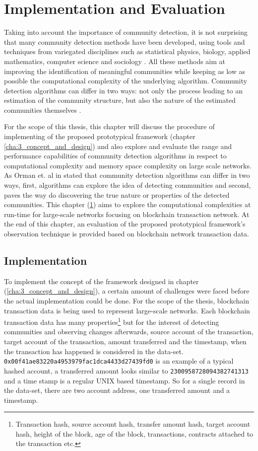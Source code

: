 \chapter{Implementation and Evaluation}\label{cha:4_implementation_and_evaluation}
Taking into account the importance of community detection, it is not surprising that many community detection methods have been developed, using tools and techniques from variegated disciplines such as statistical physics, biology, applied mathematics, computer science and sociology \cite{ref-49}. All these methods aim at improving the identification of meaningful communities while keeping as low as possible the computational complexity of the underlying algorithm. Community detection algorithms can differ in two ways: not only the process leading to an estimation of the community structure, but also the nature of the estimated communities themselves \cite{ref-50}. 

For the scope of this thesis, this chapter will discuss the procedure of implementing of the proposed prototypical framework (chapter \ref{cha:3_concept_and_design}) and also explore and evaluate the range and performance capabilities of community detection algorithms in respect to computational complexity and memory space complexity on large scale networks. As Orman et. al in \cite{ref-50} stated that community detection algorithms can differ in two ways, first, algorithms can explore the idea of detecting communities and second, paves the way do discovering the true nature or properties of the detected communities. This chapter (\ref{cha:4_implementation_and_evaluation}) aims to explore the computational complexities at run-time for large-scale networks focusing on blockchain transaction network. At the end of this chapter, an evaluation of the proposed prototypical framework's observation technique is provided based on blockchain network transaction data.

\section{Implementation}
To implement the concept of the framework designed in chapter (\ref{cha:3_concept_and_design}), a certain amount of challenges were faced before the actual implementation could be done. For the scope of the thesis, blockchain transaction data is being used to represent large-scale networks. Each blockchain transaction data has many properties\footnote{Transaction hash, source account hash, transfer amount hash, target account hash, height of the block, age of the block, transactions, contracts attached to the transaction etc.} but for the interest of detecting communities and observing changes afterwards, source account of the transaction, target account of the transaction, amount transferred and the timestamp, when the transaction has happened is considered in the data-set. \texttt{0x00f41ae83220a4953979fac1dca4433d27439fd0} is an example of a typical hashed account, a transferred amount looks similar to \texttt{2300958728094382741313} and a time stamp is a regular UNIX based timestamp. So for a single record in the data-set, there are two account address, one transferred amount and a timestamp.

